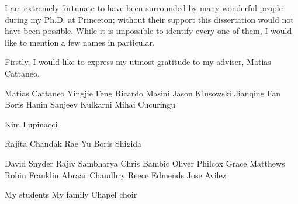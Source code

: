 
I am extremely fortunate to have been surrounded by many wonderful people during
my Ph.D. at Princeton; without their support this dissertation
would not have been possible. While it is impossible to identify every one of them,
I would like to mention a few names in particular.

Firstly, I would like to express my utmost gratitude to my adviser,
Matias Cattaneo.

Matias Cattaneo
Yingjie Feng
Ricardo Masini
Jason Klusowski
Jianqing Fan
Boris Hanin
Sanjeev Kulkarni
Mihai Cucuringu

Kim Lupinacci

Rajita Chandak
Rae Yu
Boris Shigida

David Snyder
Rajiv Sambharya
Chris Bambic
Oliver Philcox
Grace Matthews
Robin Franklin
Abraar Chaudhry
Reece Edmends
Jose Avilez

My students
My family
Chapel choir
